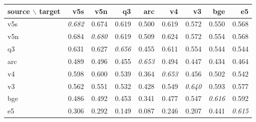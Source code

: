 \begin{tabular}{lrrrrrrrr}
\toprule
source $\backslash$ target & v5s & v5n & q3 & arc & v4 & v3 & bge & e5 \\
\midrule
v5s & \textit{0.682} & 0.674 & 0.619 & 0.500 & 0.619 & 0.572 & 0.550 & 0.568 \\
v5n & 0.684 & \textit{0.680} & 0.619 & 0.509 & 0.624 & 0.572 & 0.554 & 0.568 \\
q3 & 0.631 & 0.627 & \textit{0.656} & 0.455 & 0.611 & 0.554 & 0.544 & 0.544 \\
arc & 0.489 & 0.496 & 0.455 & \textit{0.653} & 0.494 & 0.447 & 0.434 & 0.464 \\
v4 & 0.598 & 0.600 & 0.539 & 0.364 & \textit{0.653} & 0.456 & 0.502 & 0.542 \\
v3 & 0.562 & 0.551 & 0.532 & 0.428 & 0.549 & \textit{0.640} & 0.593 & 0.577 \\
bge & 0.486 & 0.492 & 0.453 & 0.341 & 0.477 & 0.547 & \textit{0.616} & 0.592 \\
e5 & 0.306 & 0.292 & 0.149 & 0.087 & 0.246 & 0.207 & 0.441 & \textit{0.615} \\
\bottomrule
\end{tabular}